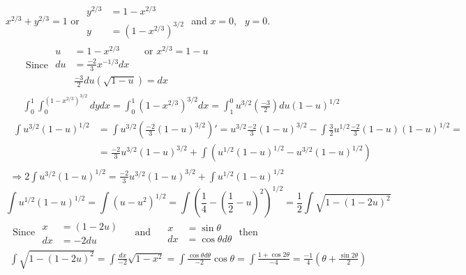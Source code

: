 \documentclass[twoside]{amsart}
\theoremstyle{plain}
\theoremstyle{definition}
\newcommand{\exercisehead}[1]
  {
   \noindent{\small\bf Exercise #1.}
   \smallskip}
\begin{document}
\exercisehead{8} $x^{2/3} + y^{2/3} = 1$ or $\begin{aligned} y^{2/3} & = 1 - x^{2/3} \\ y & = (1-x^{2/3})^{3/2} \end{aligned}$ and $x =0$, \, $ y=0$.  
\[
\begin{gathered}
  \text{ Since } \begin{aligned} u & = 1 - x^{2/3} \quad \quad \, \text{ or } x^{2/3} = 1 - u \\ du & = \frac{-2}{3} x^{-1/3} dx \\ & \frac{-3}{2} du ( \sqrt{ 1 - u } ) = dx \end{aligned} \\ 
  \int_0^1 \int_0^{(1-x^{2/3})^{3/2} } dy dx = \int_0^1 (1-x^{2/3})^{3/2} dx = \int_1^0 u^{3/2} \left( \frac{-3}{2} \right) du (1-u)^{1/2} 
\end{gathered}
\]
\[
\begin{gathered}
\begin{aligned}
  \int u^{3/2} (1-u)^{1/2} & = \int u^{3/2} \left( \frac{-2}{3} (1-u)^{3/2} \right)' = u^{3/2} \frac{-2}{3} (1-u)^{3/2} - \int \frac{3}{2} u^{1/2} \frac{-2}{3} (1-u)(1-u)^{1/2} = \\
  & = \frac{-2}{3} u^{3/2} (1-u)^{3/2} + \int (u^{1/2} (1-u)^{1/2} - u^{3/2} (1-u)^{1/2} ) 
\end{aligned} \\
\Longrightarrow 2 \int u^{3/2}(1-u)^{1/2} = \frac{-2}{3} u^{3/2} (1-u)^{3/2} + \int u^{1/2} (1-u)^{1/2} 
\end{gathered}
\]
\[
\int u^{1/2} (1-u)^{1/2} = \int (u-u^2)^{1/2} = \int \left( \frac{1}{4} - \left( \frac{1}{2} - u\right)^2 \right)^{1/2} = \frac{1}{2} \int \sqrt{ 1 - (1-2u)^2 }
\]
\[
\begin{gathered}
\text{ Since } \begin{aligned} x & = (1-2u) \\ dx & = -2 du \end{aligned} \quad \text{ and } \quad \begin{aligned} x &= \sin{\theta} \\ dx & = \cos{\theta} d\theta \end{aligned} \text{ then } \\ 
\int \sqrt{ 1 - (1-2u)^2 } = \int \frac{dx}{-2} \sqrt{ 1 - x^2} = \int \frac{ \cos{\theta} d\theta}{-2} \cos{\theta} = \int \frac{ 1 + \cos{2\theta} }{-4}  = \frac{-1}{4} ( \theta + \frac{ \sin{2\theta}}{2} )
\end{gathered}
\]
\end{document}
